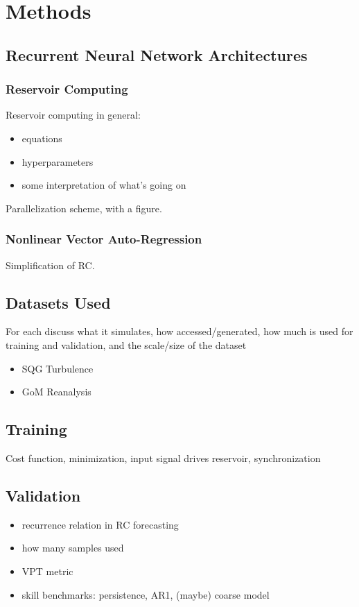 \section{Methods}
\label{sec:methods}

\subsection{Recurrent Neural Network Architectures}
\label{subsec:rnn-architecture}

\subsubsection{Reservoir Computing}
\label{subsubsec:rc-architecture}

Reservoir computing in general:
\begin{itemize}
    \item equations
    \item hyperparameters
    \item some interpretation of what's going on
\end{itemize}

Parallelization scheme, with a figure.

\subsubsection{Nonlinear Vector Auto-Regression}
\label{subsubsec:nvar-architecture}

Simplification of RC.

\subsection{Datasets Used}
\label{subsec:datasets}

For each discuss what it simulates, how accessed/generated, how much is used for
training and validation, and the scale/size of the dataset
\begin{itemize}
    \item SQG Turbulence
    \item GoM Reanalysis
\end{itemize}

\subsection{Training}
\label{subsec:training}

Cost function, minimization, input signal drives reservoir, synchronization

\subsection{Validation}
\label{subsec:validation}

\begin{itemize}
    \item recurrence relation in RC forecasting
    \item how many samples used
    \item VPT metric
    \item skill benchmarks: persistence, AR1, (maybe) coarse model
\end{itemize}
